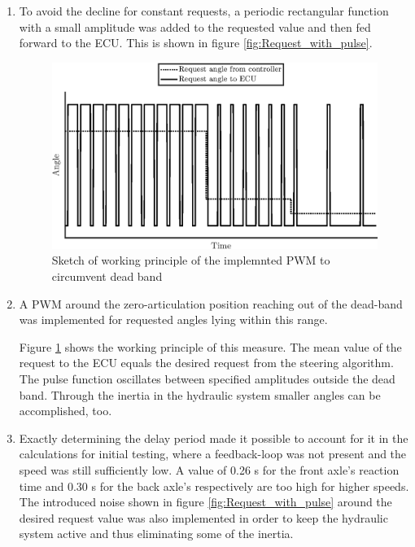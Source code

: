 \documentclass[root.tex]{subfiles}
\begin{document}
	\begin{enumerate}

		\item To avoid the decline for constant requests, a periodic rectangular function with a small amplitude was added to the requested value and then fed forward to the \gls{ECU}. This is shown in figure \ref{fig:Request_with_pulse}. 
		
		

	\begin{figure}[h!]
		\centering
		\includegraphics[width=1\linewidth]{Deadband}
		\caption[Sketch of working princiiple of the implemnted PWM to circumvent dead band]{Sketch of working principle of the implemnted PWM to circumvent dead band}
		\label{fig:Deadband}
	\end{figure}
	
		\item A \gls{PWM} around the zero-articulation position reaching out of the dead-band was implemented for requested angles lying within this range. 
		
		
		
		Figure \ref{fig:Deadband} shows the working principle of this measure. The mean value of the request to the \gls{ECU} equals the desired request from the steering algorithm. The pulse function oscillates between specified amplitudes outside the dead band. Through the inertia in the hydraulic system smaller angles can be accomplished, too.
				
		\item Exactly determining the delay period made it possible to account for it in the calculations for initial testing, where a feedback-loop was not present and the speed was still sufficiently low. A value of 0.26 \unit{s} for the front axle's reaction time and 0.30 \unit{s} for the back axle's respectively are too high for higher speeds.\\
		The introduced noise shown in figure \ref{fig:Request_with_pulse} around the desired request value was also implemented in order to keep the hydraulic system active and thus eliminating some of the inertia. 
	\end{enumerate}
	
	
	
	
	
	
\end{document}
